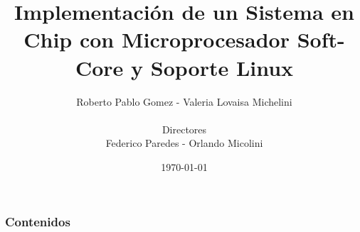 \documentclass[xcolor=dvipsnames,mathserif,9pt]{beamer}
\author[M. L. Ferster]{Roberto Pablo Gomez - Valeria Lovaisa Michelini \\ \ \\  Directores \\ Federico Paredes - Orlando Micolini}
\title[\hspace{2cm}\insertframenumber/\inserttotalframenumber]{\large
  Implementación de un Sistema en Chip con Microprocesador
Soft-Core y Soporte Linux\\
}
\date{\today} %
\begin{document}
\begin{frame}
  \titlepage
  \vspace{-0.2cm}
  \scriptsize
\end{frame}%

\begin{frame}
  \frametitle{Contenidos}
  \tableofcontents
\end{frame}

%  
%  
%  
%      
\end{document}

